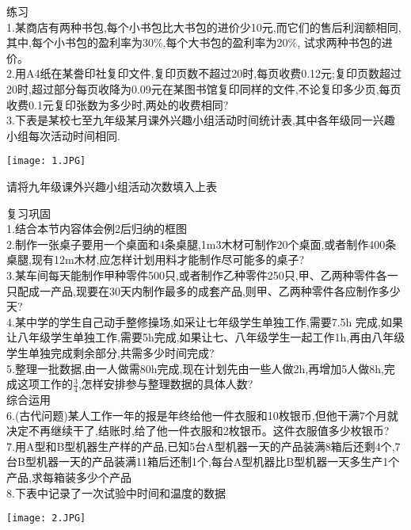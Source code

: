 \documentclass[11pt,apaper]{article}
\begin{document}
\begin{exercise}
练习\\

1.某商店有两种书包,每个小书包比大书包的进价少10元,而它们的售后利润额相同,其中,每个小书包的盈利率为30$\%$,每个大书包的盈利率为20$\%$, 试求两种书包的进价。\\
2.用A4纸在某誊印社复印文件,复印页数不超过20时,每页收费0.12元;复印页数超过20时,超过部分每页收降为0.09元在某图书馆复印同样的文件,不论复印多少页,每页收费0.1元复印张数为多少时,两处的收费相同?\\
3.下表是某校七至九年级某月课外兴趣小组活动时间统计表,其中各年级同一兴趣小组每次活动时间相同.\\
\begin{center}
  \texttt{[image: 1.JPG]}\\
\end{center}


请将九年级课外兴趣小组活动次数填入上表



复习巩固\\

1.结合本节内容体会例2后归纳的框图\\
2.制作一张桌子要用一个桌面和4条桌腿,1m3木材可制作20个桌面,或者制作400条桌腿,现有12m木材,应怎样计划用料才能制作尽可能多的桌子?\\
3.某车间每天能制作甲种零件500只,或者制作乙种零件250只,甲、乙两种零件各一只配成一产品,现要在30天内制作最多的成套产品,则甲、乙两种零件各应制作多少天?\\
4.某中学的学生自己动手整修操场,如采让七年级学生单独工作,需要7.5h 完成,如果让八年级学生单独工作,需要5h完成,如果让七、八年级学生一起工作1h,再由八年级学生单独完成剩余部分,共需多少时间完成?\\
5.整理一批数据,由一人做需80h完成,现在计划先由一些人做2h,再增加5人做8h,完成这项工作的$\frac{3}{4}$,怎样安排参与整理数据的具体人数?\\



综合运用\\

6.(古代问题)某人工作一年的报是年终给他一件衣服和10枚银币,但他干满7个月就决定不再继续干了,结账时,给了他一件衣服和2枚银币。这件衣服值多少枚银币?\\
7.用A型和B型机器生产样的产品,已知5台A型机器一天的产品装满8箱后还剩4个,7台B型机器一天的产品装满11箱后还制1个,每台A型机器比B型机器一天多生产1个产品,求每箱装多少个产品\\
8.下表中记录了一次试验中时间和温度的数据\\
\begin{center}
  \texttt{[image: 2.JPG]}\\
\end{center}


\end{exercise}
\end{document}

